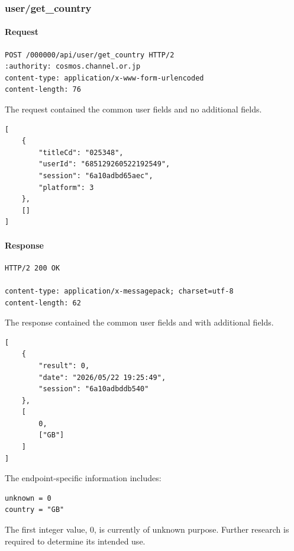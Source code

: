 \subsubsection{user/get\_country}
\label{subsec:api_user_get_country}

\paragraph{Request}

\begin{lstlisting}
POST /000000/api/user/get_country HTTP/2
:authority: cosmos.channel.or.jp
content-type: application/x-www-form-urlencoded
content-length: 76
\end{lstlisting}

The request contained the common user fields and no additional fields.

\begin{lstlisting}
[
    {
        "titleCd": "025348",
        "userId": "685129260522192549",
        "session": "6a10adbd65aec",
        "platform": 3
    },
    []
]
\end{lstlisting}

\paragraph{Response}

\begin{lstlisting}
HTTP/2 200 OK

content-type: application/x-messagepack; charset=utf-8
content-length: 62
\end{lstlisting}

The response contained the common user fields and with additional fields.

\begin{lstlisting}
[
    {
        "result": 0,
        "date": "2026/05/22 19:25:49",
        "session": "6a10adbddb540"
    },
    [
        0,
        ["GB"]
    ]
]
\end{lstlisting}

The endpoint-specific information includes:

\begin{lstlisting}
unknown = 0
country = "GB"
\end{lstlisting}

\begin{tcolorbox}[colback=yellow!10,colframe=orange!80!black,title=Warning]
The first integer value, $0$, is currently of unknown purpose.
Further research is required to determine its intended use.
\end{tcolorbox}

\newpage